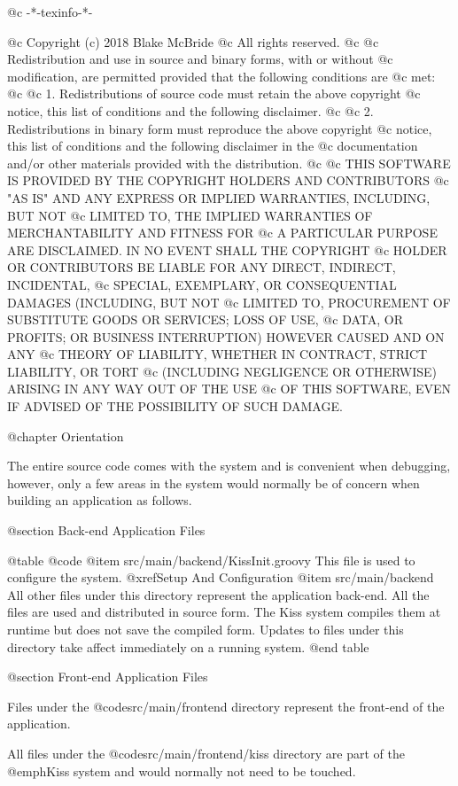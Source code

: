 @c -*-texinfo-*-

@c  Copyright (c) 2018 Blake McBride
@c  All rights reserved.
@c
@c  Redistribution and use in source and binary forms, with or without
@c  modification, are permitted provided that the following conditions are
@c  met:
@c
@c  1. Redistributions of source code must retain the above copyright
@c  notice, this list of conditions and the following disclaimer.
@c
@c  2. Redistributions in binary form must reproduce the above copyright
@c  notice, this list of conditions and the following disclaimer in the
@c  documentation and/or other materials provided with the distribution.
@c
@c  THIS SOFTWARE IS PROVIDED BY THE COPYRIGHT HOLDERS AND CONTRIBUTORS
@c  "AS IS" AND ANY EXPRESS OR IMPLIED WARRANTIES, INCLUDING, BUT NOT
@c  LIMITED TO, THE IMPLIED WARRANTIES OF MERCHANTABILITY AND FITNESS FOR
@c  A PARTICULAR PURPOSE ARE DISCLAIMED. IN NO EVENT SHALL THE COPYRIGHT
@c  HOLDER OR CONTRIBUTORS BE LIABLE FOR ANY DIRECT, INDIRECT, INCIDENTAL,
@c  SPECIAL, EXEMPLARY, OR CONSEQUENTIAL DAMAGES (INCLUDING, BUT NOT
@c  LIMITED TO, PROCUREMENT OF SUBSTITUTE GOODS OR SERVICES; LOSS OF USE,
@c  DATA, OR PROFITS; OR BUSINESS INTERRUPTION) HOWEVER CAUSED AND ON ANY
@c  THEORY OF LIABILITY, WHETHER IN CONTRACT, STRICT LIABILITY, OR TORT
@c  (INCLUDING NEGLIGENCE OR OTHERWISE) ARISING IN ANY WAY OUT OF THE USE
@c  OF THIS SOFTWARE, EVEN IF ADVISED OF THE POSSIBILITY OF SUCH DAMAGE.


@chapter Orientation


The entire source code comes with the system and is convenient when
debugging, however, only a few areas in the system would normally be
of concern when building an application as follows.


@section Back-end Application Files

@table @code
@item src/main/backend/KissInit.groovy
This file is used to configure the system. @xref{Setup And Configuration}
@item src/main/backend
All other files under this directory represent the application
back-end.  All the files are used and distributed in source form.  The
Kiss system compiles them at runtime but does not save the compiled form.
Updates to files under this directory take affect
immediately on a running system.
@end table


@section Front-end Application Files

Files under the @code{src/main/frontend} directory represent the
front-end of the application.

All files under the @code{src/main/frontend/kiss} directory are part of
the @emph{Kiss} system and would normally not need to be touched.

